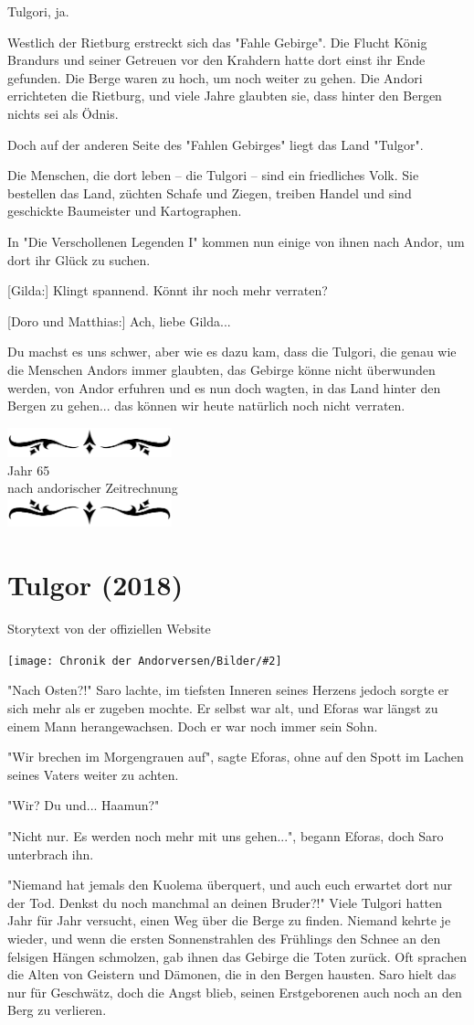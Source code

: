 \documentclass[10pt, a4paper, oneside]{book}
\newcommand{\fillbreak}{\vspace*{\fill}\columnbreak}
\newcommand{\storytext}[1]{%
    \section{#1}%
    \label{Storytext: #1}%
}
\newcommand{\bildmitts}[2][height=0.32\textwidth,width=0.48\textwidth,keepaspectratio]{%
    \begin{center}
        \texttt{[image: Chronik der Andorversen/Bilder/\#2]}
    \end{center}
}
\newcommand{\az}[1]{%
    \begin{center}
        \includegraphics[width=180px]{Chronik der Andorversen/verzierung1.png}\\
        {\Huge #1} \\
        {nach andorischer Zeitrechnung}\\
        \includegraphics[width=180px]{Chronik der Andorversen/verzierung2.png}
    \end{center}
    \extramarks{}{#1 a.Z.}
}
\begin{document}
\begin{multicols}{2}
Tulgori, ja.

Westlich der Rietburg erstreckt sich das "Fahle Gebirge". Die Flucht König Brandurs und seiner Getreuen vor den Krahdern hatte dort einst ihr Ende gefunden. Die Berge waren zu hoch, um noch weiter zu gehen. Die Andori errichteten die Rietburg, und viele Jahre glaubten sie, dass hinter den Bergen nichts sei als Ödnis.

Doch auf der anderen Seite des "Fahlen Gebirges" liegt das Land "Tulgor".

Die Menschen, die dort leben – die Tulgori – sind ein friedliches Volk. Sie bestellen das Land, züchten Schafe und Ziegen, treiben Handel und sind geschickte Baumeister und Kartographen.

In "Die Verschollenen Legenden I" kommen nun einige von ihnen nach Andor, um dort ihr Glück zu suchen.

[Gilda:] Klingt spannend. Könnt ihr noch mehr verraten?

[Doro und Matthias:] Ach, liebe Gilda...

Du machst es uns schwer, aber wie es dazu kam, dass die Tulgori, die genau wie die Menschen Andors immer glaubten, das Gebirge könne nicht überwunden werden, von Andor erfuhren und es nun doch wagten, in das Land hinter den Bergen zu gehen... das können wir heute natürlich noch nicht verraten.



\fillbreak
\az{Jahr 65}
\storytext{Tulgor (2018)}

\begin{center}
    Storytext von der offiziellen Website
\end{center}

\bildmitts{Tulgor (2018).jpg}

"Nach Osten?!" Saro lachte, im tiefsten Inneren seines Herzens jedoch sorgte er sich mehr als er zugeben mochte. Er selbst war alt, und Eforas war längst zu einem Mann herangewachsen. Doch er war noch immer sein Sohn.

"Wir brechen im Morgengrauen auf", sagte Eforas, ohne auf den Spott im Lachen seines Vaters weiter zu achten.

"Wir? Du und... Haamun?"

"Nicht nur. Es werden noch mehr mit uns gehen...", begann Eforas, doch Saro unterbrach ihn.

"Niemand hat jemals den Kuolema überquert, und auch euch erwartet dort nur der Tod. Denkst du noch manchmal an deinen Bruder?!" Viele Tulgori hatten Jahr für Jahr versucht, einen Weg über die Berge zu finden. Niemand kehrte je wieder, und wenn die ersten Sonnenstrahlen des Frühlings den Schnee an den felsigen Hängen schmolzen, gab ihnen das Gebirge die Toten zurück. Oft sprachen die Alten von Geistern und Dämonen, die in den Bergen hausten. Saro hielt das nur für Geschwätz, doch die Angst blieb, seinen Erstgeborenen auch noch an den Berg zu verlieren.


\end{multicols}
\end{document}
